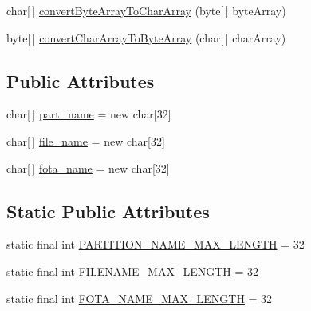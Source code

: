\begin{DoxyCompactItemize}
\item 
char\mbox{[}$\,$\mbox{]} \hyperlink{classcom_1_1casual__dev_1_1libpit_x_1_1_pit_entry_ac291912ea4f4cda011151311dfa61d82}{convert\-Byte\-Array\-To\-Char\-Array} (byte\mbox{[}$\,$\mbox{]} byte\-Array)
\item 
byte\mbox{[}$\,$\mbox{]} \hyperlink{classcom_1_1casual__dev_1_1libpit_x_1_1_pit_entry_a21223a75c18e7be3b39028a09c941137}{convert\-Char\-Array\-To\-Byte\-Array} (char\mbox{[}$\,$\mbox{]} char\-Array)
\end{DoxyCompactItemize}
\subsection*{Public Attributes}
\begin{DoxyCompactItemize}
\item 
char\mbox{[}$\,$\mbox{]} \hyperlink{classcom_1_1casual__dev_1_1libpit_x_1_1_pit_entry_a5e197e4cf04138a9e720a994180c201a}{part\-\_\-name} = new char\mbox{[}32\mbox{]}
\item 
char\mbox{[}$\,$\mbox{]} \hyperlink{classcom_1_1casual__dev_1_1libpit_x_1_1_pit_entry_ad93dbdb15b0bb12a5d9d11b4c0c39bc3}{file\-\_\-name} = new char\mbox{[}32\mbox{]}
\item 
char\mbox{[}$\,$\mbox{]} \hyperlink{classcom_1_1casual__dev_1_1libpit_x_1_1_pit_entry_a2ef9ed0e10b3ab23970737151f0a4fdb}{fota\-\_\-name} = new char\mbox{[}32\mbox{]}
\end{DoxyCompactItemize}
\subsection*{Static Public Attributes}
\begin{DoxyCompactItemize}
\item 
static final int \hyperlink{classcom_1_1casual__dev_1_1libpit_x_1_1_pit_entry_a05a88dc71b70a2b50683401e40ee749c}{P\-A\-R\-T\-I\-T\-I\-O\-N\-\_\-\-N\-A\-M\-E\-\_\-\-M\-A\-X\-\_\-\-L\-E\-N\-G\-T\-H} = 32
\item 
static final int \hyperlink{classcom_1_1casual__dev_1_1libpit_x_1_1_pit_entry_aa49ecaa5b5e55f512423b3f0389f0c57}{F\-I\-L\-E\-N\-A\-M\-E\-\_\-\-M\-A\-X\-\_\-\-L\-E\-N\-G\-T\-H} = 32
\item 
static final int \hyperlink{classcom_1_1casual__dev_1_1libpit_x_1_1_pit_entry_a0261d2e80e710971cdb7bdff99a9b3ee}{F\-O\-T\-A\-\_\-\-N\-A\-M\-E\-\_\-\-M\-A\-X\-\_\-\-L\-E\-N\-G\-T\-H} = 32
\end{DoxyCompactItemize}


